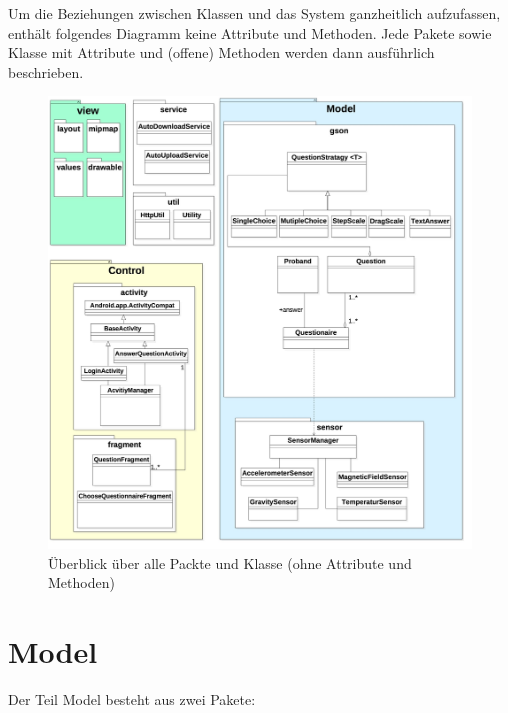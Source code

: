 \documentclass[a4paper]{scrreprt}
\begin{document}
            \noindent Um die Beziehungen zwischen Klassen und das System ganzheitlich aufzufassen, enthält folgendes Diagramm keine Attribute und Methoden. Jede Pakete sowie Klasse mit Attribute und (offene) Methoden werden dann ausführlich beschrieben.



            \newpage
            \vspace*{1cm}
            \begin{figure}[H]
                \centering
                \includegraphics[scale = 0.25]{packageDiagram.jpg}
                \caption{Überblick über alle Packte und Klasse (ohne Attribute und Methoden)}
            \end{figure}





        \section{Model}

            Der Teil Model besteht aus zwei Pakete:
\end{document}
